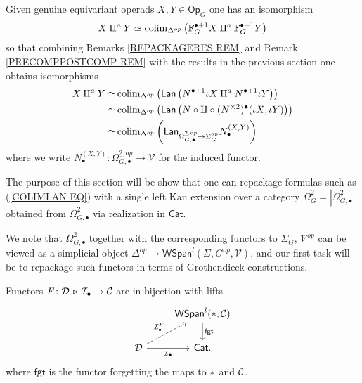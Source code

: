 \documentclass[a4paper,10pt]{article}%
\begin{document}
Given genuine equivariant operads 
$X,Y \in \mathsf{Op}_G$
one has an isomorphism
\[
	X \amalg^a Y 
\simeq
	\operatorname{colim}_{\Delta^{op}} 
	\left(
	\mathbb{F}_G^{\bullet+1} X \amalg^a \mathbb{F}_G^{\bullet+1} Y
	\right)
\]
so that combining Remarks \ref{REPACKAGERES REM}
and
Remark \ref{PRECOMPPOSTCOMP REM}
with the results in the previous section one obtains isomorphisms
\begin{align}
	X \amalg^a Y  
\simeq &
	\operatorname{colim}_{\Delta^{op}} 
	\left(
	\mathsf{Lan} \left(
	N^{\bullet+1} \iota X \amalg^a N^{\bullet+1} \iota Y
	\right) \right)
\\
\simeq &
	\operatorname{colim}_{\Delta^{op}} 
	\left(
	\mathsf{Lan} \left(
	N \circ \amalg \circ (N^{\times 2})^{\bullet} (\iota X,\iota Y)
	\right) \right)
\\ \label{COLIMLAN EQ}
\simeq &
	\operatorname{colim}_{\Delta^{op}} 
	\left(
	\mathsf{Lan}_{\Omega_{G,\bullet}^{\underline{2},op} \to \Sigma_G^{op}}
	N_{\bullet}^{(X,Y)}
	\right)
\end{align}
where we write 
$N_{\bullet}^{(X,Y)} \colon \Omega_{G,\bullet}^{\underline{2},op} \to \mathcal{V}$
for the induced functor.

The purpose of this section will be show that one can repackage 
formulas such as (\ref{COLIMLAN EQ})
with a single left Kan extension over a category
$\Omega_G^{\underline{2}} = |\Omega_{G,\bullet}^{\underline{2}}|$
obtained from 
$\Omega_{G,\bullet}^{\underline{2}}$
via realization in $\mathsf{Cat}$.

We note that $\Omega_{G,\bullet}^{\underline{2}}$ together with the corresponding functors to $\Sigma_G$, $\mathcal{V}^{op}$
can be viewed as a simplicial object 
$\Delta^{op} \to \mathsf{WSpan}^l(\Sigma,G^{op},\mathcal{V})$,
and our first task will be to repackage such functors in terms of Grothendieck constructions.


\begin{lemma}\label{SIMPSPANREIN LEMMA}
Functors $F \colon \mathcal{D} \ltimes \mathcal{I}_{\bullet} \to \mathcal{C}$ are in bijection with lifts
\[
\begin{tikzcd}
    & \mathsf{WSpan}^l(\**,\C) \ar{d}{\mathsf{fgt}} \\
\mathcal{D} \ar{r}[swap]{\mathcal{I}_{\bullet}} \ar[dashed]{ru}{\mathcal{I}_{\bullet}^F} & \mathsf{Cat}.
\end{tikzcd}
\]
where $\mathsf{fgt}$ is the functor forgetting the maps to $\**$ and $\mathcal{C}$.
\end{lemma}
\end{document}
